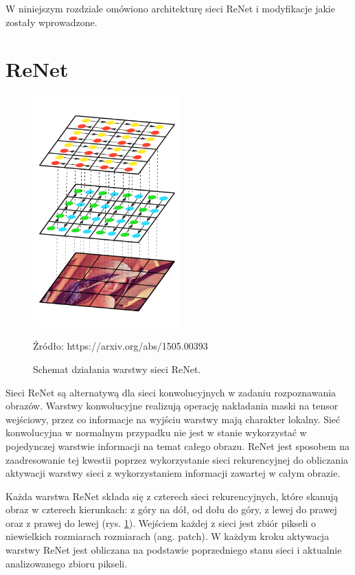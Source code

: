 \documentclass[oneside, mag]{mgr}
\begin{document}
W niniejszym rozdziale omówiono architekturę sieci ReNet i modyfikacje jakie zostały wprowadzone.

\section{ReNet}

\begin{figure}
\centering
	\includegraphics[width=0.5\textwidth]{img/ReNet.png}
	\caption{Schemat działania warstwy sieci ReNet.} Źródło: https://arxiv.org/abs/1505.00393
	\label{fig:ReNet-single-layer}
\end{figure}

Sieci ReNet \cite{DBLP:journals/corr/VisinKCMCB15} są alternatywą dla sieci konwolucyjnych w zadaniu rozpoznawania obrazów. Warstwy konwolucyjne realizują operację nakładania maski na tensor wejściowy, przez co informacje na wyjściu warstwy mają charakter lokalny. Sieć konwolucyjna w normalnym przypadku nie jest w stanie wykorzystać w pojedynczej warstwie informacji na temat całego obrazu. ReNet jest sposobem na zaadresowanie tej kwestii poprzez wykorzystanie sieci rekurencyjnej do obliczania aktywacji warstwy sieci z wykorzystaniem informacji zawartej w całym obrazie.

Każda warstwa ReNet składa się z czterech sieci rekurencyjnych, które skanują obraz w czterech kierunkach: z góry na dół, od dołu do góry, z lewej do prawej oraz z prawej do lewej (rys. \ref{fig:ReNet-single-layer}). Wejściem każdej z sieci jest zbiór pikseli o niewielkich rozmiarach rozmiarach (ang. patch). W każdym kroku aktywacja warstwy ReNet jest obliczana na podstawie poprzedniego stanu sieci i aktualnie analizowanego zbioru pikseli. 
\end{document}
